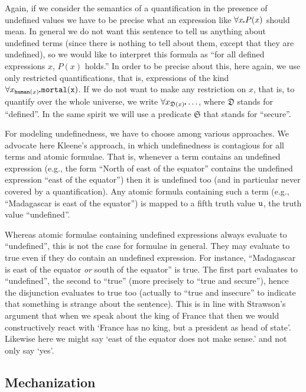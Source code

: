 \documentclass{\filespath jancl}
\def\sdot{\rule{.3ex}{.3ex}\hspace{-0.4ex}\;} %
\newcommand{\Defined}{{\mathfrak D}}
\newcommand{\Secure}{{\mathfrak S}}
\newcommand{\undefined}{{\sf u}}
\newcommand{\all}[3]{\forall {#1}_{#2}\sdot #3}
\def\sf{\tt}
\begin{document}
Again, if we consider the semantics of a quantification in the presence of
undefined values we have to be precise what an expression like
$\forall x\sdot P(x)$ should mean.  In general we do not want this
sentence to tell us anything about undefined terms (since there
is nothing to tell about them, except that they are undefined), so we
would like to interpret this formula as ``for all defined expressions
$x$, $P(x)$ holds.''  In order to be precise about this, here again,
we use only restricted quantifications, that is, expressions of the
kind $\all{x}{{\sf human}(x)} {\sf mortal}(x)$.  If we do not want to
make any restriction on $x$, that is, to quantify over the whole
universe, we write $\all{x}{\Defined(x)} \ldots$, where $\Defined$
stands for ``defined''.  In the same spirit we will use a predicate
$\Secure$ that stands for ``secure''.

For modeling undefinedness, we have to choose among various
approaches.  We advocate here Kleene's approach, in which
undefinedness is contagious for all terms and atomic formulae. That
is, whenever a term contains an undefined expression (e.g., the form
``North of east of the equator'' contains the undefined expression
``east of the equator'') then it is undefined too (and in particular
never covered by a quantification).  Any atomic formula containing
such a term (e.g., ``Madagascar is east of the equator'') is mapped to
a fifth truth value $\undefined$, the truth value ``undefined''.

Whereas atomic formulae containing undefined expressions always
evaluate to ``undefined'', this is not the case for formulae in
general. They may evaluate to true even if they do contain an
undefined expression.  For instance, ``Madagascar is east of the
equator {\em or\/} south of the equator'' is true.  The first part
evaluates to ``undefined'', the second to ``true'' (more precisely to
``true and secure''), hence the disjunction evaluates to true too
(actually to ``true and insecure'' to indicate that something is
strange about the sentence). This is in line with Strawson's argument
that when we speak about the king of France that then we would
constructively react with `France has no king, but a president as head
of state'. Likewise here we might say `east of the equator does not
make sense.' and not only say `yes'.


\subsection{Mechanization} %
\label{sec:atp}
\end{document}

